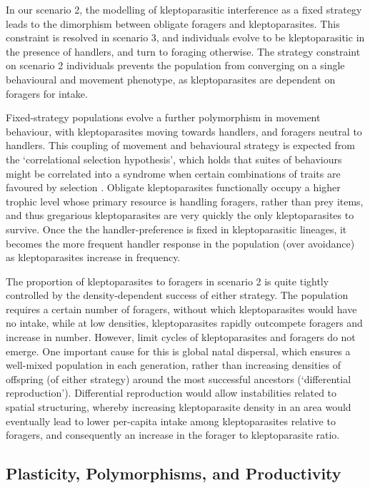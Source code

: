 \documentclass[11pt]{article}
\begin{document}
In our scenario 2, the modelling of kleptoparasitic interference as a fixed strategy leads to the dimorphism between obligate foragers and kleptoparasites.
This constraint is resolved in scenario 3, and individuals evolve to be kleptoparasitic in the presence of handlers, and turn to foraging otherwise.
The strategy constraint on scenario 2 individuals prevents the population from converging on a single behavioural and movement phenotype, as kleptoparasites are dependent on foragers for intake.

Fixed-strategy populations evolve a further polymorphism in movement behaviour, with kleptoparasites moving towards handlers, and foragers neutral to handlers.
This coupling of movement and behavioural strategy is expected from the `correlational selection hypothesis', which holds that suites of behaviours might be correlated into a syndrome when certain combinations of traits are favoured by selection \citep{wolf2010,sih2004}.
Obligate kleptoparasites functionally occupy a higher trophic level whose primary resource is handling foragers, rather than prey items, and thus gregarious kleptoparasites are very quickly the only kleptoparasites to survive.
Once the the handler-preference is fixed in kleptoparasitic lineages, it becomes the more frequent handler response in the population (over avoidance) as kleptoparasites increase in frequency.

The proportion of kleptoparasites to foragers in scenario 2 is quite tightly controlled by the density-dependent success of either strategy.
The population requires a certain number of foragers, without which kleptoparasites would have no intake, while at low densities, kleptoparasites rapidly outcompete foragers and increase in number.
However, limit cycles of kleptoparasites and foragers do not emerge.
One important cause for this is global natal dispersal, which ensures a well-mixed population in each generation, rather than increasing densities of offspring (of either strategy) around the most successful ancestors (`differential reproduction').
Differential reproduction would allow instabilities related to spatial structuring, whereby increasing  kleptoparasite density in an area would eventually lead to lower per-capita intake among kleptoparasites relative to foragers, and consequently an increase in the forager to kleptoparasite ratio.

\subsection{Plasticity, Polymorphisms, and Productivity}
\end{document}
